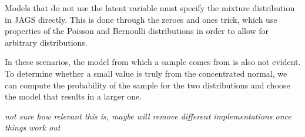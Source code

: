\documentclass[12pt,twoside]{dukestatscithesis}
\theoremstyle{definition}
\theoremstyle{definition}
\theoremstyle{definition}
\theoremstyle{remark}
\begin{document}
Models that do not use the latent variable must specify the mixture
distribution in JAGS directly. This is done through the zeroes and ones
trick, which use properties of the Poisson and Bernoulli distributions
in order to allow for arbitrary distributions.

In these scenarios, the model from which a sample comes from is also not
evident. To determine whether a small value is truly from the
concentrated normal, we can compute the probability of the sample for
the two distributions and choose the model that results in a larger one.

\emph{not sure how relevant this is, maybe will remove different
implementations once things work out}
\begin{Shaded}
\begin{Highlighting}[]
\StringTok{ }\NormalTok{() \{}
   \OperatorTok{:}
\OperatorTok{~}\StringTok{ }
    \StringTok{  }
  
   \OperatorTok{:}
\NormalTok{[l] }\OperatorTok{~}\StringTok{ }
\StringTok{ }\NormalTok{[l]}\OperatorTok{*}
\NormalTok{  \}}
\StringTok{ }\OperatorTok{-}\NormalTok{)}
\StringTok{ }\NormalTok{(}\OperatorTok{-}
\StringTok{ }\NormalTok{(}\OperatorTok{-}\OperatorTok{*}\NormalTok{(}\OperatorTok{-}\OperatorTok{+}\StringTok{ }
\StringTok{    }\NormalTok{(}\NormalTok{,}\NormalTok{)}\OperatorTok{*}
  

\end{Highlighting}
\end{Shaded}
\end{document}
